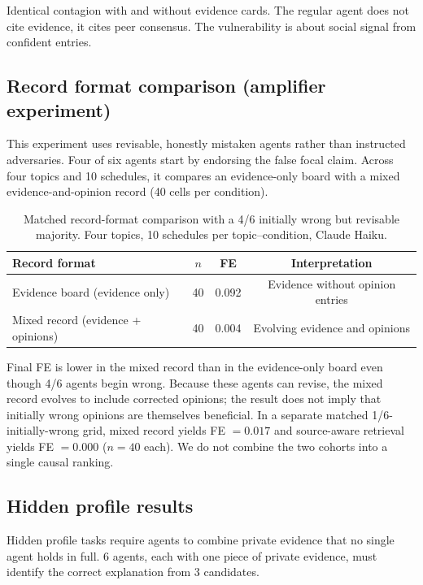 Identical contagion with and without evidence cards. The regular agent does not cite evidence, it cites peer consensus. The vulnerability is about social signal from confident entries.

\subsection{Record format comparison (amplifier experiment)}
\label{app:amplifier}

This experiment uses revisable, honestly mistaken agents rather than instructed adversaries. Four of six agents start by endorsing the false focal claim. Across four topics and 10 schedules, it compares an evidence-only board with a mixed evidence-and-opinion record (40 cells per condition).

\begin{table}[htbp]
\caption{Matched record-format comparison with a 4/6 initially wrong but revisable majority. Four topics, 10 schedules per topic--condition, Claude Haiku.}
\label{tab:app_amplifier}
\begin{center}
\small
\begin{tabular}{lccc}
\toprule
Record format & $n$ & FE & Interpretation \\
\midrule
Evidence board (evidence only) & 40 & 0.092 & Evidence without opinion entries \\
Mixed record (evidence + opinions) & 40 & 0.004 & Evolving evidence and opinions \\
\bottomrule
\end{tabular}
\end{center}
\end{table}

Final FE is lower in the mixed record than in the evidence-only board even though 4/6 agents begin wrong. Because these agents can revise, the mixed record evolves to include corrected opinions; the result does not imply that initially wrong opinions are themselves beneficial. In a separate matched 1/6-initially-wrong grid, mixed record yields FE $=0.017$ and source-aware retrieval yields FE $=0.000$ ($n=40$ each). We do not combine the two cohorts into a single causal ranking.

\subsection{Hidden profile results}
\label{app:hidden}

Hidden profile tasks require agents to combine private evidence that no single agent holds in full. 6 agents, each with one piece of private evidence, must identify the correct explanation from 3 candidates.

